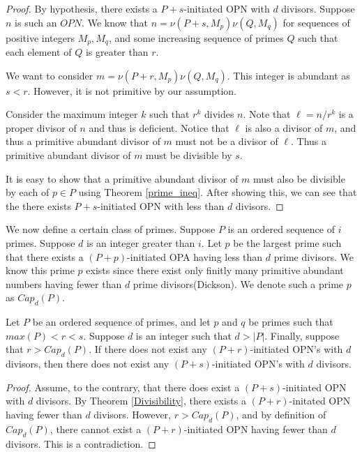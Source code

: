 \documentclass[../paper.tex]{subfiles}
\begin{document}
\begin{proof}
By hypothesis, there exists a $P + s$-initiated OPN with $d$ divisors.
Suppose $n$ is such an $OPN$. We know that $n = \nu(P + s, M_p) 
\nu(Q, M_q)$ for sequences of positive integers $M_p, M_q$, and 
some increasing sequence of primes $Q$ such that each element of $Q$ is 
greater than $r$. 

  We want to consider $m = \nu(P + r, M_p) \nu(Q, M_q)$. This 
integer is abundant as $s < r$. However, it is not primitive by 
our assumption.


Consider the maximum integer $k$ such that $r^k$ divides $n$.
Note that $\ell = n / r^{k}$ is a proper divisor of $n$ and
thus is deficient. Notice that $\ell$ is also a divisor of $m$, 
and thus a primitive abundant divisor of $m$ must not be a 
divisor of $\ell$. Thus a primitive abundant divisor of $m$ must 
be divisible by $s$.

  It is easy to show that a primitive abundant divisor of $m$ must
also be divisible by each of $p \in P$  using Theorem
{\ref{prime_ineq}}. After showing this, we can see that the 
there exists $P + s$-initiated OPN with less than $d$ divisors.
\end{proof}

We now define a certain class of primes.
Suppose $P$ is an ordered sequence of $i$ primes. Suppose $d$ is
an integer greater than $i$. Let $p$ be the largest prime such 
that there exists a $(P + p)$-initiated OPA having less than $d$ 
prime divisors\footnotemark. 
We know this prime $p$ exists since 
there exist only finitly many primitive abundant numbers having
fewer than $d$ prime divisors(Dickson). We denote such a prime $p$
as $Cap_d(P)$. 

\begin{theorem}
Let $P$ be an ordered sequence of primes, and  let $p$ and $q$ be 
primes such that $max(P) < r < s$. Suppose $d$ is an integer such
that $d > |P|$. Finally, suppose that $r > Cap_d(P)$. If there
does not exist any $(P + r)$-initiated OPN's with $d$ divisors,
then there does not exist any $(P + s)$-initiated OPN's with $d$ 
divisors.
\end{theorem}

\begin{proof}
Assume, to the contrary, that there does exist a $(P + 
s)$-initiated OPN with $d$ divisors. By Theorem {\ref{Divisibility}},
there exists a $(P + r)$-initated OPN having fewer than $d$
divisors. However, $r > Cap_d(P)$, and by definition of
$Cap_d(P)$, there cannot exist a $(P + r)$-initiated OPN having
fewer than $d$ divisors. This is a contradiction.
\end{proof}
\end{document}
